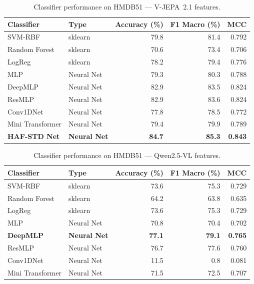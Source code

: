 \begin{table}[H]
\centering
\caption{Classifier performance on HMDB51 --- V-JEPA~2.1 features.}
\label{tab:hmdb_vjepa_clf}
\begin{tabular}{llrrr}
\toprule
\textbf{Classifier} & \textbf{Type} & \textbf{Accuracy (\%)} & \textbf{F1 Macro (\%)} & \textbf{MCC} \\
\midrule
SVM-RBF       & sklearn & 79.8 & 81.4 & 0.792 \\
Random Forest & sklearn & 70.6 & 73.4 & 0.706 \\
LogReg        & sklearn & 78.2 & 79.4 & 0.776 \\
\midrule
MLP           & Neural Net & 79.3 & 80.3 & 0.788 \\
DeepMLP       & Neural Net & 82.9 & 83.5 & 0.824 \\
ResMLP        & Neural Net & 82.9 & 83.6 & 0.824 \\
Conv1DNet     & Neural Net & 77.8 & 78.5 & 0.772 \\
Mini Transformer & Neural Net & 79.4 & 79.9 & 0.789 \\
\midrule
\textbf{HAF-STD Net} & \textbf{Neural Net} & \textbf{84.7} & \textbf{85.3} & \textbf{0.843} \\
\bottomrule
\end{tabular}
\end{table}

\begin{table}[H]
\centering
\caption{Classifier performance on HMDB51 --- Qwen2.5-VL features.}
\label{tab:hmdb_qwen_clf}
\begin{tabular}{llrrr}
\toprule
\textbf{Classifier} & \textbf{Type} & \textbf{Accuracy (\%)} & \textbf{F1 Macro (\%)} & \textbf{MCC} \\
\midrule
SVM-RBF       & sklearn & 73.6 & 75.3 & 0.729 \\
Random Forest & sklearn & 64.2 & 63.8 & 0.635 \\
LogReg        & sklearn & 73.6 & 75.3 & 0.729 \\
\midrule
MLP           & Neural Net & 70.8 & 70.4 & 0.702 \\
\textbf{DeepMLP} & \textbf{Neural Net} & \textbf{77.1} & \textbf{79.1} & \textbf{0.765} \\
ResMLP        & Neural Net & 76.7 & 77.6 & 0.760 \\
Conv1DNet     & Neural Net & 11.5 &  0.8 & 0.081 \\
Mini Transformer & Neural Net & 71.5 & 72.5 & 0.707 \\
\bottomrule
\end{tabular}
\end{table}

